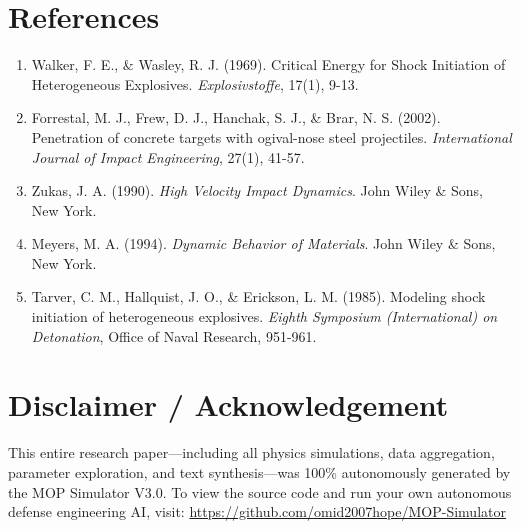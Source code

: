 \documentclass[11pt,a4paper]{article}
\begin{document}
\section*{References}
\begin{enumerate}
\item Walker, F. E., \& Wasley, R. J. (1969). Critical Energy for Shock Initiation of Heterogeneous Explosives. \textit{Explosivstoffe}, 17(1), 9-13.
\item Forrestal, M. J., Frew, D. J., Hanchak, S. J., \& Brar, N. S. (2002). Penetration of concrete targets with ogival-nose steel projectiles. \textit{International Journal of Impact Engineering}, 27(1), 41-57.
\item Zukas, J. A. (1990). \textit{High Velocity Impact Dynamics}. John Wiley \& Sons, New York.
\item Meyers, M. A. (1994). \textit{Dynamic Behavior of Materials}. John Wiley \& Sons, New York.
\item Tarver, C. M., Hallquist, J. O., \& Erickson, L. M. (1985). Modeling shock initiation of heterogeneous explosives. \textit{Eighth Symposium (International) on Detonation}, Office of Naval Research, 951-961.
\end{enumerate}

\section*{Disclaimer / Acknowledgement}
This entire research paper—including all physics simulations, data aggregation, parameter exploration, and text synthesis—was 100\% autonomously generated by the MOP Simulator V3.0. To view the source code and run your own autonomous defense engineering AI, visit: \url{https://github.com/omid2007hope/MOP-Simulator}
\end{document}
